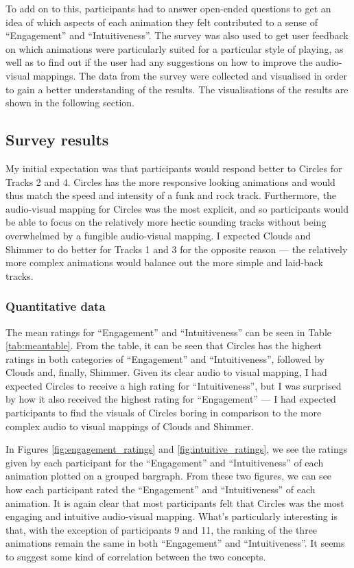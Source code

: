 \documentclass[../initial_thesis.tex]{subfiles}
\begin{document}
To add on to this, participants had to answer open-ended questions to get an idea of which aspects of each animation they felt contributed to a sense of ``Engagement'' and ``Intuitiveness''. The survey was also used to get user feedback on which animations were particularly suited for a particular style of playing, as well as to find out if the user had any suggestions on how to improve the audio-visual mappings. The data from the survey were collected and visualised in order to gain a better understanding of the results. The visualisations of the results are shown in the following section. \par

\subsection{Survey results}
My initial expectation was that participants would respond better to Circles for Tracks 2 and 4. Circles has the more responsive looking animations and would thus match the speed and intensity of a funk and rock track. Furthermore, the audio-visual mapping for Circles was the most explicit, and so participants would be able to focus on the relatively more hectic sounding tracks without being overwhelmed by a fungible audio-visual mapping. I expected Clouds and Shimmer to do better for Tracks 1 and 3 for the opposite reason --- the relatively more complex animations would balance out the more simple and laid-back tracks.

\subsubsection{Quantitative data}
The mean ratings for ``Engagement'' and ``Intuitiveness'' can be seen in Table \ref{tab:meantable}. From the table, it can be seen that Circles has the highest ratings in both categories of ``Engagement'' and ``Intuitiveness'', followed by Clouds and, finally, Shimmer. Given its clear audio to visual mapping, I had expected Circles to receive a high rating for ``Intuitiveness'', but I was surprised by how it also received the highest rating for ``Engagement'' --- I had expected participants to find the visuals of Circles boring in comparison to the more complex audio to visual mappings of Clouds and Shimmer.\par

In Figures \ref{fig:engagement_ratings} and \ref{fig:intuitive_ratings}, we see the ratings given by each participant for the ``Engagement'' and ``Intuitiveness'' of each animation plotted on a grouped bargraph. From these two figures, we can see how each participant rated the ``Engagement'' and ``Intuitiveness'' of each animation. It is again clear that most participants felt that Circles was the most engaging and intuitive audio-visual mapping. What's particularly interesting is that, with the exception of participants 9 and 11, the ranking of the three animations remain the same in both ``Engagement'' and ``Intuitiveness''. It seems to suggest some kind of correlation between the two concepts.
\end{document}
